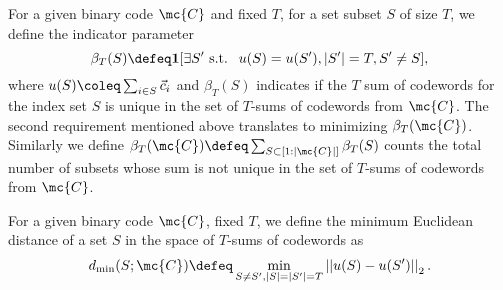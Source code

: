 \documentclass[final,onecolumn,12pt]{IEEEtran}
\def\dmin{d_{\mathrm{min}}}
\begin{document}

\begin{definition}
For a given binary code $\mc{C}$ and fixed $T$, for a set subset $S$ of size $T$, we define the indicator parameter
\[
\beta_T(S) \defeq \mathbf{1}[\exists S' \text{ s.t. }~ u(S)= u(S'), |S'|=T,S'\neq S],
\]
where $u(S)\coleq \sum_{i\in S}\vec{c}_i$ and $\beta_T(S)$ indicates if the $T$ sum of codewords for the index set $S$ is unique in the set of $T$-sums of codewords from $\mc{C}$. The second requirement mentioned above translates to minimizing $\beta_T(\mc{C})$. Similarly we define $\beta_T(\mc{C})\defeq \sum_{S\subset [1:|\mc{C}|]}\beta_T(S)$ counts the total number of subsets whose sum is not unique in the set of $T$-sums of codewords from $\mc{C}$.
\label{Def:disjunctive_parameter_Tsum}
\end{definition}

\begin{definition}
For a given binary code $\mc{C}$, fixed $T$, we define the minimum Euclidean distance of a set $S$ in the space of  $T$-sums of codewords as
\[
\dmin(S;\mc{C})\defeq \min_{S\neq S',|S|=|S'|=T} \left|\left| u(S)-u(S') \right|\right|_2.
\]
\label{Def:dmin_Tsum}
\end{definition}
\end{document}
